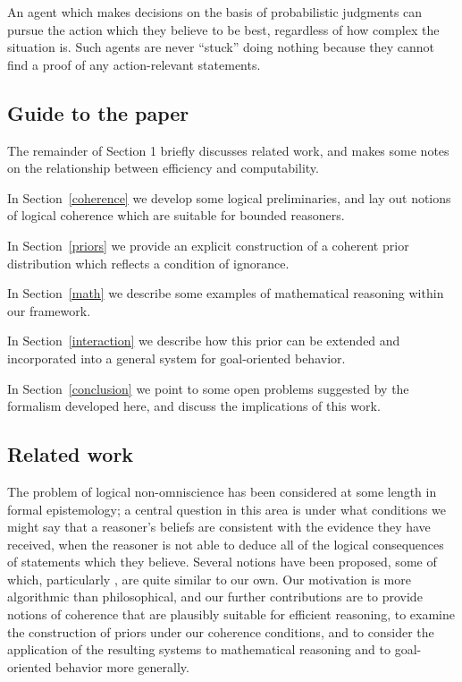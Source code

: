 \documentclass[12pt]{article}
\theoremstyle{definition}
\begin{document}
An agent which makes decisions on the basis of probabilistic judgments
can pursue the action which they believe to be best,
regardless of how complex the situation is.
Such agents are never ``stuck'' doing nothing because they cannot
find a proof of any action-relevant statements.

\subsection{Guide to the paper}


The remainder of Section 1 briefly discusses related work,
and makes some notes on the relationship between efficiency
and computability.

In Section~\ref{coherence} we develop some logical preliminaries,
and lay out notions of logical coherence which are suitable for bounded
reasoners. 

In Section~\ref{priors} we provide an explicit construction of a coherent
prior distribution which reflects a condition of ignorance.

In Section~\ref{math} we describe some examples
of mathematical reasoning within our framework.

In Section~\ref{interaction} we describe how this prior
can be extended and incorporated into a general system
for goal-oriented behavior. 

In Section~\ref{conclusion} we point to some open problems
suggested by the formalism developed here,
and discuss the implications of this work.

\subsection{Related work}

The problem of logical non-omniscience
has been considered at some length in formal epistemology;
a central question in this area is under what conditions
we might say that a reasoner's beliefs are consistent
with the evidence they have received,
when the reasoner is not able to deduce all of the logical
consequences of statements which they believe.
Several notions have been proposed,
some of which, particularly \cite{gaifman04},
are quite similar to our own.
Our motivation is more algorithmic than philosophical,
and our further contributions are to provide
notions of coherence that are plausibly suitable for efficient
reasoning, to examine the construction of priors under
our coherence conditions,
and to consider the application of the resulting systems
to mathematical reasoning and to goal-oriented behavior more generally.
\end{document}
